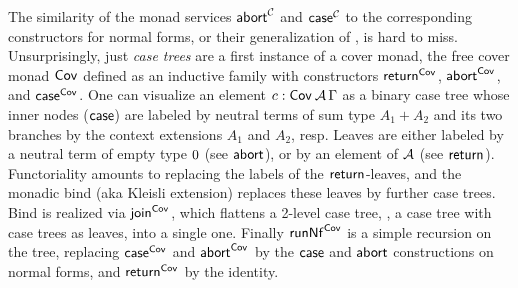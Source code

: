 \documentclass[sigplan,screen,fleqn,review]{acmart} %
\begin{document}
The similarity of the monad services $\tabort^\C$ and $\tcase^\C$ to
the corresponding constructors for normal forms, or their
generalization of , is hard to miss.
Unsurprisingly, just \emph{case trees} are a first instance of a cover monad,
the free cover monad
$\Cov$ defined
as an inductive family with constructors
$\treturn[\Cov]$, $\tabort^{\Cov}$, and
$\tcase^{\Cov}$.
One can visualize an element $c : \Cov\,\A\,\Gamma$ as a
binary case tree whose inner nodes ($\tcase$) are labeled by neutral terms
of sum type $A_1+A_2$ and its two branches by the context extensions $A_1$
and $A_2$, resp.  Leaves are either
labeled by a neutral term of empty type $\tyzero$ (see $\tabort$),
or by an element of $\A$ (see $\treturn$).  Functoriality amounts to
replacing the labels of the $\treturn$-leaves, and the monadic bind
(aka Kleisli extension) replaces
these leaves by further case trees.  Bind is realized via $\tjoin[\Cov]$,
which flattens a 2-level case tree, \ie, a case tree with case trees as
leaves, into a single one.
Finally $\trunNf[\Cov]$ is a simple recursion on the tree, replacing $\tcase^{\Cov}$
and $\tabort^{\Cov}$
by the $\tcase$ and $\tabort$ constructions on normal forms, and
$\treturn[\Cov]$ by the identity.

\end{document}
